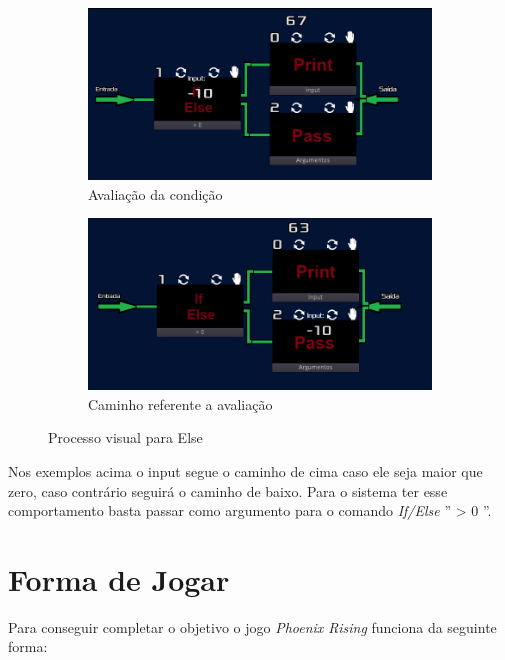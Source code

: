\begin{figure}[H]
    \centering
    \begin{subfigure}{0.48\textwidth}
        \centering
        \includegraphics[width=1\textwidth]{../figuras/avaliacao_else.png}
        \caption{Avaliação da condição}
    \end{subfigure}
    \begin{subfigure}{0.48\textwidth}
        \centering
        \includegraphics[width=1\textwidth]{../figuras/caminho_else.png}
        \caption{Caminho referente a avaliação}
    \end{subfigure}  
    \caption{Processo visual para Else}
\end{figure}

Nos exemplos acima o input segue o caminho de cima caso ele seja maior que zero,
caso contrário seguirá o caminho de baixo. Para o sistema ter esse comportamento
basta passar como argumento para o comando \textit{If/Else} '' > 0 ''.

\section{Forma de Jogar}
\label{sec:consideracoes_preliminares}

Para conseguir completar o objetivo o jogo \textit{Phoenix Rising} funciona
da seguinte forma:

